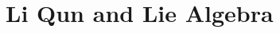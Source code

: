 \chapter{Li Qun and Lie Algebra}
\label{cpt: 4}



\newpage



\newpage


\newpage


\newpage


\newpage
